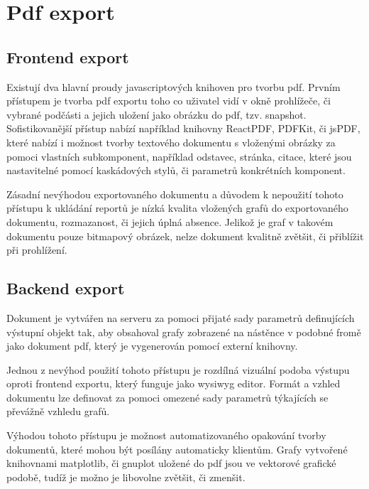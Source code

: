 \documentclass[FM,BP]{tulthesis}
\begin{document}

\chapter{Pdf export}
    \section{Frontend export}
        Existují dva hlavní proudy javascriptových knihoven pro tvorbu pdf. 
        Prvním přístupem je tvorba pdf exportu toho co uživatel vidí v okně prohlížeče, či vybrané podčásti a jejich uložení jako obrázku do pdf, tzv. snapshot. 
        Sofistikovanější přístup nabízí například knihovny ReactPDF, PDFKit, či jsPDF, 
        které nabízí i možnost tvorby textového dokumentu s vloženými obrázky za pomoci vlastních subkomponent, například odstavec, stránka, citace, 
        které jsou nastavitelné pomocí kaskádových stylů, či parametrů konkrétních komponent.

        Zásadní nevýhodou exportovaného dokumentu a důvodem k nepoužití tohoto přístupu k ukládání reportů je nízká kvalita vložených grafů do exportovaného dokumentu, 
        rozmazanost, či jejich úplná absence. 
        Jelikož je graf v takovém dokumentu pouze bitmapový obrázek, nelze dokument kvalitně zvětšit, či přiblížit při prohlížení.

    \section{Backend export}
        Dokument je vytvářen na serveru za pomoci přijaté sady parametrů definujících výstupní objekt tak, 
        aby obsahoval grafy zobrazené na nástěnce v podobné fromě jako dokument pdf, který je vygenerován pomocí externí knihovny.

        Jednou z nevýhod použití tohoto přístupu je rozdílná vizuální podoba výstupu oproti frontend exportu, který funguje jako wysiwyg editor. 
        Formát a vzhled dokumentu lze definovat za pomoci omezené sady parametrů týkajících se převážně vzhledu grafů.

        Výhodou tohoto přístupu je možnost automatizovaného opakování tvorby dokumentů, které mohou být posílány automaticky klientům. 
        Grafy vytvořené knihovnami matplotlib, či gnuplot uložené do pdf jsou ve vektorové grafické podobě, tudíž je možno je libovolne zvětšit, či zmenšit.
\end{document}
